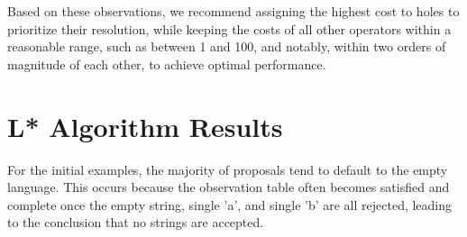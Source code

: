 \indent\indent Based on these observations, we recommend assigning the highest cost to holes to prioritize their resolution, while keeping the costs of all other operators within a reasonable range, such as between 1 and 100, and notably, within two orders of magnitude of each other, to achieve optimal performance.

\section{L* Algorithm Results}

\indent\indent For the initial examples, the majority of proposals tend to default to the empty language. This occurs because the observation table often becomes satisfied and complete once the empty string, single 'a', and single 'b' are all rejected, leading to the conclusion that no strings are accepted.


